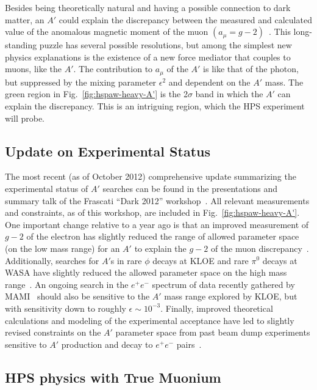 Besides being theoretically natural and having a possible connection to dark matter, an $A'$ could explain the discrepancy between the measured and 
calculated value of the anomalous magnetic moment of the muon $(a_\mu=g-2)$~\cite{Pospelov:2008zw}.  
This long-standing puzzle has several possible resolutions, but among the simplest new physics explanations
is the existence of a new force mediator that couples to muons, like the $A'$.  The contribution to $a_\mu$ of the $A'$ 
is like that of the photon, but suppressed by the mixing parameter $\epsilon^2$ and dependent on the $A'$ mass.  
The green region in Fig.~\ref{fig:hspaw-heavy-A'} is the 2$\sigma$ band in which the $A'$ can 
explain the discrepancy.  This is an intriguing region, which the HPS experiment will probe.  

\subsection{Update on Experimental Status}

The most recent (as of October 2012) comprehensive update summarizing the experimental status of $A'$ searches 
can be found in the presentations and summary talk of the Frascati ``Dark 2012'' workshop~\cite{Dark2012}.
All relevant measurements and constraints, as of this workshop, are included in Fig.~\ref{fig:hspaw-heavy-A'}.
One important change relative to a year ago is that an improved measurement of $g-2$ of the electron
has slightly reduced the range of allowed parameter space (on the low mass range) for an $A'$ to explain the $g-2$ of the muon 
discrepancy~\cite{endo:g2e,Davoudiasl:2012ig}. 
Additionally, searches for $A'$s in rare $\phi$ decays at KLOE and rare $\pi^0$ decays at WASA have slightly reduced 
the allowed parameter space on the high mass range~\cite{rarek}. 
An ongoing search in the $e^+e^-$ spectrum of data recently gathered by MAMI~\cite{Merkel:2011ze} should also 
be sensitive to the $A'$ mass range explored by KLOE, but with sensitivity down to roughly $\epsilon\sim 10^{-3}$. 
Finally, improved theoretical calculations and modeling of the experimental acceptance have led to slightly revised constraints on the 
$A'$ parameter space from past beam dump experiments sensitive to $A'$ production and decay to $e^+e^-$ pairs~\cite{andreas}.


\subsection{HPS physics with True Muonium}

